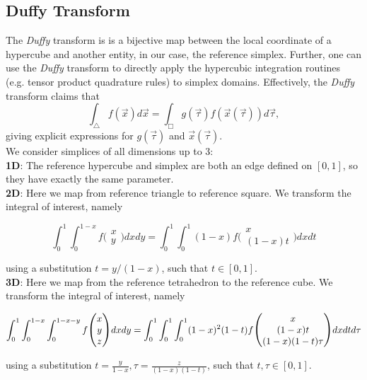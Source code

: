 \subsection{Duffy Transform}
\label{section-abstract-duffy-transform}

The \textit{Duffy} transform is is a bijective map between the local coordinate of a hypercube and another entity, in our case, the reference simplex. Further, one can use the \textit{Duffy} transform to directly apply the hypercubic integration routines (e.g. tensor product quadrature rules) to simplex domains. Effectively, the \textit{Duffy} transform claims that
\[\int_{\triangle} f(\vec{x}) d\vec{x} = \int_{\Box} g(\vec{\tau}) f(\vec{x}(\vec{\tau})) d\vec{\tau},\]
giving explicit expressions for $g(\vec{\tau})$ and $\vec{x}(\vec{\tau})$. \\

\noindent
We consider simplices of all dimensions up to 3: \\

\noindent
\textbf{1D}: The reference hypercube and simplex are both an edge defined on $[0, 1]$, so they have exactly the same parameter. \\

\noindent
\textbf{2D}: Here we map from reference triangle to reference square. We transform the integral of interest, namely

\[ \int_0^1 \int_0^{1-x} f \biggl(
\begin{matrix}  x \\ y  \end{matrix} \biggr)
 dx dy = \int_0^1 \int_0^1 (1-x) 
f \biggl( \begin{matrix} x \\ (1-x)t \end{matrix} \biggr)
dx dt \]

\noindent
using a substitution $t = y / (1 - x)$, such that $t \in [0, 1]$. \\

\noindent
\textbf{3D}: Here we map from the reference tetrahedron to the reference cube. We transform the integral of interest, namely

\[ \int_0^1 \int_0^{1-x} \int_0^{1-x-y} f \scalebox{1.2}{\Bigg(}
\begin{matrix}  x \\ y \\ z  \end{matrix} \scalebox{1.2}{\Bigg)}
dx dy = \int_0^1 \int_0^1 \int_0^1 (1-x)^2 (1-t)
f \scalebox{1.2}{\Bigg(} \begin{matrix}  x \\ (1-x)t \\ (1-x)(1-t)\tau  \end{matrix} \scalebox{1.2}{\Bigg)}
dx dt d\tau \]

\noindent
using a substitution $t = \frac{y}{1 - x}, \tau = \frac{z}{(1 - x)(1 - t)}$, such that $t,\tau \in [0, 1]$. \\